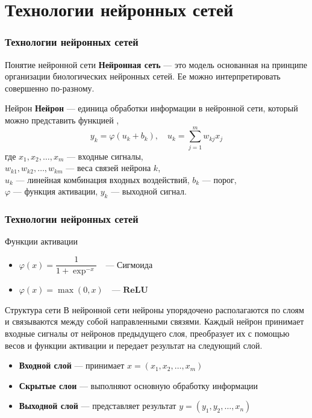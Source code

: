 \documentclass{beamer}
\renewcommand{\phi}{\varphi}
\begin{document}
	
\section{Технологии нейронных сетей}

\begin{frame}
	\frametitle{Технологии нейронных сетей}
	\begin{block}{Понятие нейронной сети}
	 \textbf{Нейронная сеть} --- это модель основанная на принципе организации биологических нейронных сетей. Ее можно интерпретировать совершенно по-разному.
	\end{block}
	\begin{block}{Нейрон}
	\textbf{Нейрон} --- единица обработки информации в нейронной сети, который можно представить функцией \cite[c.28]{7}, \hyperlink{pril2}{}
	\begin{equation}
		y_k = \phi(u_k + b_k), \quad u_k = \sum_{j = 1}^{m} w_{kj}x_j 
		\label{1}
	\end{equation}
	где $x_1, x_2, \dots, x_m$ --- входные сигналы, \\
	$w_{k1}, w_{k2}, \dots, w_{km}$ --- веса связей нейрона $k$, \\
	$u_k $ --- линейная комбинация входных воздействий,
	$b_k$ --- порог,\\
	$ \phi $ --- функция активации,
	$ y_k $ --- выходной сигнал.
	\end{block}
\end{frame}

\begin{frame}
	\frametitle{Технологии нейронных сетей}
	\begin{block}{Функции активации}
		\begin{itemize}
			\item $\phi(x) =  \dfrac{1}{1+\exp^{-x}} \quad\textbf{--- Сигмоида} $
			\item $\phi(x) =  \max(0, x)  \quad\textbf{--- ReLU}$
		\end{itemize} 
	\end{block}
	\begin{block}{Структура сети}
		В нейронной сети нейроны упорядочено располагаются по слоям и связываются между собой направленными связями. Каждый нейрон принимает входные сигналы от нейронов предыдущего слоя, преобразует их с помощью весов и функции активации и передает результат на следующий слой. 
	\end{block}
	\begin{itemize}
		\item \textbf{Входной слой} --- принимает $x = (x_1, x_2, \dots, x_m)$
		\item \textbf{Скрытые слои} --- выполняют основную обработку информации
		\item \textbf{Выходной слой} --- представляет результат $y = (y_1, y_2, \dots, x_n)$
	\end{itemize} 
\end{frame}
\end{document}
